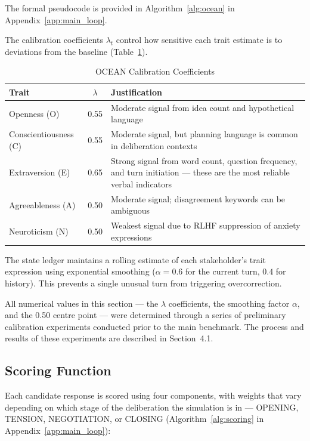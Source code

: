 \documentclass[12pt, a4paper]{report}
\begin{document}
The formal pseudocode is provided in Algorithm~\ref{alg:ocean} in Appendix~\ref{app:main_loop}.

The calibration coefficients $\lambda_t$ control how sensitive each trait estimate is to deviations from the baseline (Table~\ref{tab:lambda}).

\begin{table}[t]
\centering
\caption{OCEAN Calibration Coefficients}
\label{tab:lambda}
\begin{tabular}{lcp{6cm}}
\toprule
Trait & $\lambda$ & Justification \\
\midrule
Openness (O) & 0.55 & Moderate signal from idea count and hypothetical language \\
Conscientiousness (C) & 0.55 & Moderate signal, but planning language is common in deliberation contexts \\
Extraversion (E) & 0.65 & Strong signal from word count, question frequency, and turn initiation --- these are the most reliable verbal indicators \\
Agreeableness (A) & 0.50 & Moderate signal; disagreement keywords can be ambiguous \\
Neuroticism (N) & 0.50 & Weakest signal due to RLHF suppression of anxiety expressions \\
\bottomrule
\end{tabular}
\end{table}

The state ledger maintains a rolling estimate of each stakeholder's trait expression using exponential smoothing ($\alpha = 0.6$ for the current turn, $0.4$ for history). This prevents a single unusual turn from triggering overcorrection.

All numerical values in this section --- the $\lambda$ coefficients, the smoothing factor $\alpha$, and the 0.50 centre point --- were determined through a series of preliminary calibration experiments conducted prior to the main benchmark. The process and results of these experiments are described in Section~4.1.

\subsection{Scoring Function}

Each candidate response is scored using four components, with weights that vary depending on which stage of the deliberation the simulation is in --- OPENING, TENSION, NEGOTIATION, or CLOSING (Algorithm~\ref{alg:scoring} in Appendix~\ref{app:main_loop}):
\end{document}
